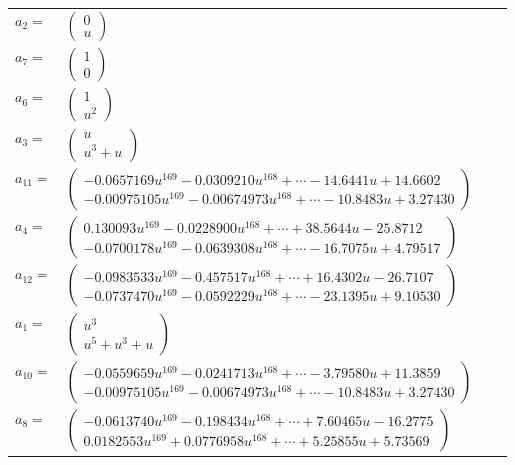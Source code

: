 \documentclass[1p]{elsarticle_modified}
\theoremstyle{definition}
\begin{document}
\begin{tabular}{m{7pt} m{180pt} m{7pt} m{180pt} }
\flushright $a_{2}=$&$\begin{pmatrix}0\\u\end{pmatrix}$ \\
\flushright $a_{7}=$&$\begin{pmatrix}1\\0\end{pmatrix}$ \\
\flushright $a_{6}=$&$\begin{pmatrix}1\\u^2\end{pmatrix}$ \\
\flushright $a_{3}=$&$\begin{pmatrix}u\\u^3+u\end{pmatrix}$ \\
\flushright $a_{11}=$&$\begin{pmatrix}-0.0657169 u^{169}-0.0309210 u^{168}+\cdots-14.6441 u+14.6602\\-0.00975105 u^{169}-0.00674973 u^{168}+\cdots-10.8483 u+3.27430\end{pmatrix}$ \\
\flushright $a_{4}=$&$\begin{pmatrix}0.130093 u^{169}-0.0228900 u^{168}+\cdots+38.5644 u-25.8712\\-0.0700178 u^{169}-0.0639308 u^{168}+\cdots-16.7075 u+4.79517\end{pmatrix}$ \\
\flushright $a_{12}=$&$\begin{pmatrix}-0.0983533 u^{169}-0.457517 u^{168}+\cdots+16.4302 u-26.7107\\-0.0737470 u^{169}-0.0592229 u^{168}+\cdots-23.1395 u+9.10530\end{pmatrix}$ \\
\flushright $a_{1}=$&$\begin{pmatrix}u^3\\u^5+u^3+u\end{pmatrix}$ \\
\flushright $a_{10}=$&$\begin{pmatrix}-0.0559659 u^{169}-0.0241713 u^{168}+\cdots-3.79580 u+11.3859\\-0.00975105 u^{169}-0.00674973 u^{168}+\cdots-10.8483 u+3.27430\end{pmatrix}$ \\
\flushright $a_{8}=$&$\begin{pmatrix}-0.0613740 u^{169}-0.198434 u^{168}+\cdots+7.60465 u-16.2775\\0.0182553 u^{169}+0.0776958 u^{168}+\cdots+5.25855 u+5.73569\end{pmatrix}$ \\

\end{tabular}
\end{document}
